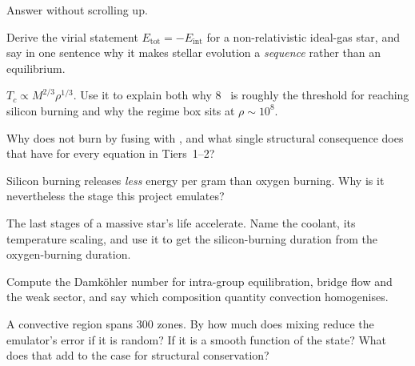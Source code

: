Answer without scrolling up.

\begin{selfcheck}
\item Derive the virial statement $E_{\mathrm{tot}} = -E_{\mathrm{int}}$ for a
  non-relativistic ideal-gas star, and say in one sentence why it makes stellar
  evolution a \emph{sequence} rather than an equilibrium.
\item $T_c \propto M^{2/3}\rho^{1/3}$. Use it to explain both why 8~\Msun{} is
  roughly the threshold for reaching silicon burning and why the regime box sits
  at $\rho \sim 10^8$.
\item Why does  not burn by fusing with , and what
  single structural consequence does that have for every equation in
  Tiers~1--2?
\item Silicon burning releases \emph{less} energy per gram than oxygen burning.
  Why is it nevertheless the stage this project emulates?
\item The last stages of a massive star's life accelerate. Name the coolant, its
  temperature scaling, and use it to get the silicon-burning duration from the
  oxygen-burning duration.
\item Compute the Damk\"ohler number for intra-group equilibration, bridge flow
  and the weak sector, and say which composition quantity convection
  homogenises.
\item A convective region spans 300 zones. By how much does mixing reduce the
  emulator's \Ye{} error if it is random? If it is a smooth function of the
  state? What does that add to the case for structural conservation?
\end{selfcheck}
